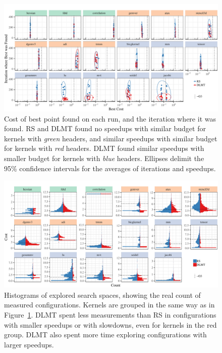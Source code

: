 \documentclass[conference]{IEEEtran}
\begin{document}
\begin{center}
\begin{figure}[p]
\centering
\includegraphics[width=\textwidth]{./img/iteration_best_comparison.pdf}
\caption{\label{fig:orgae48e1b}
Cost of best point found on each run, and the iteration where it was found. RS and DLMT found no speedups with similar budget for kernels with \emph{green} headers, and similar speedups with similar budget for kernels with \emph{red} headers. DLMT found similar speedups with smaller budget for kernels with \emph{blue} headers. Ellipses delimit the 95\% confidence intervals for the averages of iterations and speedups.}
\end{figure}
\end{center}

\begin{center}
\begin{figure}[p]
\centering
\includegraphics[width=\textwidth]{./img/split_histograms.pdf}
\caption{\label{fig:org35b7437}
Histograms of explored search spaces, showing the real count of measured configurations. Kernels are grouped in the same way as in Figure~\ref{fig:orgae48e1b}. DLMT spent less measurements than RS in configurations with smaller speedups or with slowdowns, even for kernels in the red group. DLMT also spent more time exploring configurations with larger speedups.}
\end{figure}
\end{center}
\end{document}
